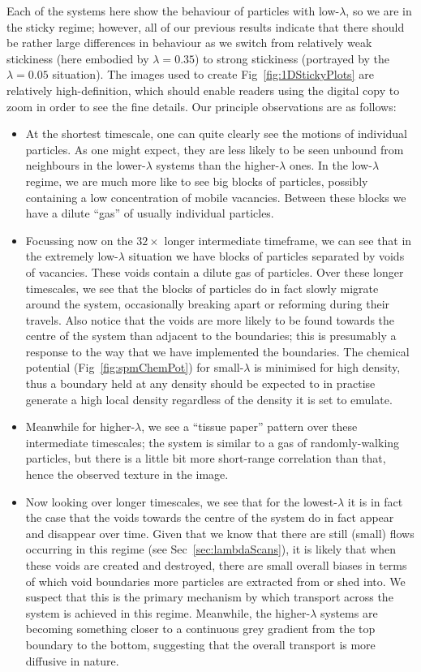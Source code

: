Each of the systems here show the behaviour of particles with low-$\lambda$, so we are in the sticky regime;
however, all of our previous results indicate that there should be rather large differences in behaviour
as we switch from relatively weak stickiness (here embodied by $\lambda=0.35$) to strong stickiness
(portrayed by the $\lambda = 0.05$ situation). The images used to create Fig~\ref{fig:1DStickyPlots} are
relatively high-definition, which should enable readers using the digital copy to zoom in order to see the fine 
details. Our principle observations are as follows:
\begin{itemize}
 \item At the shortest timescale, one can quite clearly see the motions of individual particles. As one
 might expect, they are less likely to be seen unbound from neighbours in the lower-$\lambda$ systems than
 the higher-$\lambda$ ones. In the low-$\lambda$ regime, we are much more like to see big blocks of 
 particles, possibly containing a low concentration of mobile vacancies. Between these blocks we have a dilute
 ``gas'' of usually individual particles.
 \item Focussing now on the $32\times$ longer intermediate timeframe, we can see that in the extremely 
 low-$\lambda$
 situation we have blocks of particles separated by voids of vacancies. These voids contain a dilute gas
 of particles. Over these longer timescales, we see that the blocks of particles do in fact slowly migrate
 around the system, occasionally breaking apart or reforming during their travels. Also notice that the 
 voids are more likely to be found towards the centre of the system than adjacent to the boundaries;
 this is presumably a response to the way that we have implemented the boundaries. The chemical potential
 (Fig~\ref{fig:spmChemPot}) for small-$\lambda$ is minimised for high density, thus a boundary held at any
 density should be expected to in practise generate a high local density regardless of the density it is
 set to emulate.
 \item Meanwhile for higher-$\lambda$, we see a ``tissue paper'' pattern over these intermediate
 timescales; the system is similar to a gas of randomly-walking particles, but there is a little bit more
 short-range correlation than that, hence the observed texture in the image.
 \item Now looking over longer timescales, we see that for the lowest-$\lambda$ it is in fact the case that 
 the voids towards the centre of the system do in fact appear and disappear over time. Given that we know 
 that there are still (small) flows occurring in this regime (see Sec~\ref{sec:lambdaScans}), it is
 likely that when these voids are created and destroyed, there are small overall biases in terms of
 which void boundaries more particles are extracted from or shed into. We suspect that
 this is the primary mechanism by which transport across the system is achieved in this regime. Meanwhile,
 the higher-$\lambda$ systems are becoming something closer to a continuous grey gradient from the top
 boundary to the bottom, suggesting that the overall transport is more diffusive in nature.
\end{itemize}



